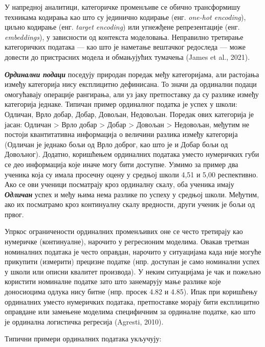 У напредној аналитици, категоричке променљиве се обично трансформишу техникама кодирања као што су јединично кодирање (енг. \textit{one-hot encoding}), циљно кодирање (енг. \textit{target encoding}) или угнежђене репрезентације (енг. \textit{embeddings}), у зависности од контекста моделовања. Неправилно третирање категоричких података — као што је наметање вештачког редоследа — може довести до пристрасних модела и обмањујућих тумачења (James et al., 2021).

\textbf{\textit{Ординални подаци}} поседују природан поредак међу категоријама, али растојања између категорија нису експлицитно дефинисана. То значи да ординални подаци омогућавају операције рангирања, али уз јаку претпоставку да су разлике између категорија једнаке. Типичан пример ординалног податка је успех у школи: Одличан, Врло добар, Добар, Довољан, Недовољан. Поредак ових категорија је јасан: Одличан > Врло добар > Добар > Довољан > Недовољан, међутим не постоји квантитативна информација о величини разлика између категорија (Одличан је једнако бољи од Врло доброг, као што је и Добар бољи од Довољног). Додатно, коришћењем ординалних података уместо нумеричких губи се део информација које иначе могу бити доступне. Узмимо за пример два ученика која су имала просечну оцену у средњој школи 4,51 и 5,00 респективно. Ако се ови ученици посматрају кроз ординалну скалу, оба ученика имају \textbf{\textit{Одличан }}успех и међу њима нема разлике по успеху у средњој школи. Међутим, ако их посматрамо кроз континуалну скалу вредности, други ученик је бољи од првог. 

Упркос ограничености ординалних променљивих оне се често третирају као нумеричке (континуалне), нарочито у регресионим моделима. Овакав третман номиналних података је често оправдан, нарочито у ситуацијама када није могуће прикупити (измерити) прецизне податке (нпр. доступан је само номинални успех у школи или описни квалитет производа). У неким ситуацијама је чак и пожељно користити номиналне податке зато што занемарују мање разлике које доносиоцима одлука нису битне (нпр. просек 4.82 и 4.85). Ипак при коришћењу ординалних уместо нумеричких података, претпоставке морају бити експлицитно оправдане или замењене моделима специфичним за ординалне податке, као што је ординална логистичка регресија (Agresti, 2010).

Типични примери ординалних података укључују: 

